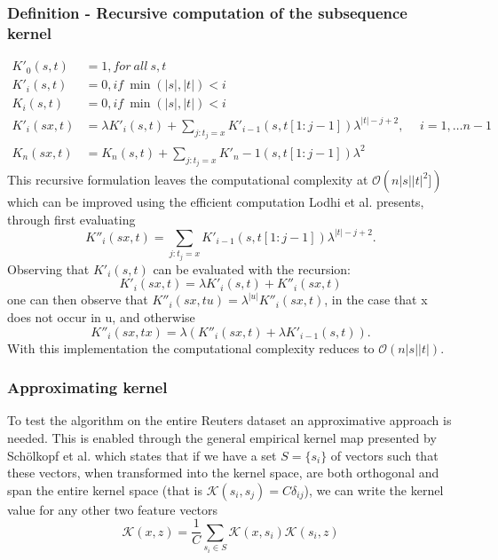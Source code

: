 \subsubsection{Definition - Recursive computation of the subsequence kernel}
\begin{align*}
	K'_{0}(s,t) & = 1, for\ all\ s,t \\
	K'_i(s,t) & = 0, if\ \min(|s|,|t|) < i \\
	K_i(s,t) & = 0, if\ \min(|s|,|t|) < i \\
	K'_i(sx,t) & = \lambda K'_i(s,t) + \sum_{j:t_j=x} K'_{i-1}(s,t[1:j-1])\lambda^{|t|-j+2}, \hspace{15pt} i = 1, \dots n-1 \\	
	K_{n}(sx,t) & = K_n(s,t) + \sum_{j:t_j = x}K'_n-1(s,t[1:j-1])\lambda^2
\end{align*}  
This recursive formulation leaves the computational complexity at $ \mathcal{O}(n|s||t|^2]) $ which can be improved using the efficient computation Lodhi et al. presents, through first evaluating
\begin{equation*}\label{key}
K''_i(sx,t) = \sum_{j:t_j = x}K'_{i-1}(s,t[1:j-1])\lambda^{|t|-j+2}.
\end{equation*}
Observing that $ K'_i(s,t) $ can be evaluated with the recursion:
\begin{equation*}\label{key}
K'_i(sx,t) = \lambda K'_i(s,t) + K''_i(sx,t)
\end{equation*}
one can then observe that $ K''_i(sx,tu) = \lambda^{|u|}K''_i(sx,t)$, in the case that x does not occur in u, and otherwise 
\begin{equation*}\label{key}
K''_i(sx,tx) = \lambda \left( K''_i(sx,t) + \lambda K'_{i-1}(s,t) \right).
\end{equation*} 
With this implementation the computational complexity reduces to $ \mathcal{O}(n|s||t|) $.



\subsubsection{Approximating kernel}
To test the algorithm on the entire Reuters dataset an approximative approach is needed. This is enabled through the general empirical kernel map presented by Schölkopf et al. which states that if we have a set $ S = \{s_i\} $ of vectors such that these vectors, when transformed into the kernel space, are both orthogonal and span the entire kernel space (that is $ \mathcal{K}(s_i,s_j) = C\delta_{ij} $), we can write the kernel value for any other two feature vectors
\begin{equation}\label{eq:kernel_approx}
\mathcal{K}(x,z) = \dfrac{1}{C}\sum_{s_i \in S}\mathcal{K}(x,s_i)\mathcal{K}(s_i,z)
\end{equation}

